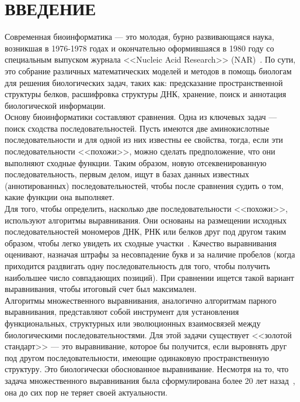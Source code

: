 \newpage
\part*{\large \centering ВВЕДЕНИЕ}
\hspace{\parindent} Современная биоинформатика --- это молодая, бурно развивающаяся наука, возникшая в 1976-1978 годах и окончательно оформившаяся в 1980 году со специальным выпуском журнала <<Nucleic Acid Research>> (NAR)~\cite{MironovLect}. По сути, это собрание различных математических моделей и методов в помощь биологам для решения биологических задач, таких как: предсказание пространственной структуры белков, расшифровка структуры ДНК, хранение, поиск и аннотация биологической информации.\\
\indent Основу биоинформатики составляют сравнения. Одна из ключевых задач --- поиск сходства последовательностей. Пусть имеются две аминокислотные последовательности и для одной из них известны ее свойства, тогда, если эти последовательности <<похожи>>, можно сделать предположение, что они выполняют сходные функции. Таким образом, новую отсеквенированную последовательность, первым делом, ищут в базах данных известных (аннотированных) последовательностей, чтобы после сравнения судить о том, какие функции она выполняет.\\
\indent Для того, чтобы определить, насколько две последовательности <<похожи>>, используют алгоритмы выравнивания. Они основаны на размещении исходных последовательностей мономеров ДНК, РНК или белков друг под другом таким образом, чтобы легко увидеть их сходные участки~\cite{WikiPairAlign}. Качество выравнивания оценивают, назначая штрафы за несовпадение букв и за наличие пробелов (когда приходится раздвигать одну последовательность для того, чтобы получить наибольшее число совпадающих позиций). При сравнении ищется такой вариант выравнивания, чтобы итоговый счет был максимален.\\ 
\indent Алгоритмы множественного выравнивания, аналогично алгоритмам парного выравнивания, представляют собой инструмент для установления функциональных, структурных или эволюционных взаимосвязей между биологическими последовательностями. Для этой задачи существует <<золотой стандарт>> --- это выравнивание, которое бы получится, если выровнять друг под другом последовательности, имеющие одинаковую пространственную структуру. Это биологически обоснованное выравнивание. Несмотря на то, что задача множественного выравнивания была сформулирована более 20 лет назад~\cite{SIAM_Journal}, она до сих пор не теряет своей актуальности.\\ 
